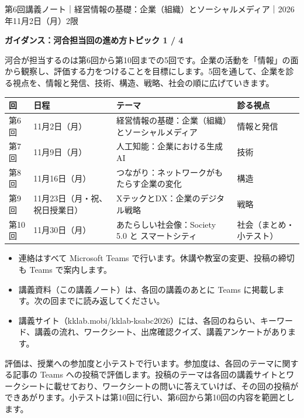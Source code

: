 \documentclass[paper=a4paper,fontsize=10pt,line_length=170mm,number_of_lines=46,baselineskip=1.6zw]{jlreq}
\newcommand\topichead[4]{%
  {\sffamily\footnotesize\color{grayt}#1\par}\vspace{1.5mm}
  {\sffamily\bfseries\LARGE #4}\hfill\colorbox{accent}{\sffamily\footnotesize\bfseries トピック #2 / #3}\par
  \vspace{1.2mm}{\color{ink}\hrule height 0.6pt}\vspace{3mm}}
\newcommand\subhead[1]{\par\vspace{2.6mm}{\sffamily\bfseries\large #1}\par\vspace{1.3mm}}
\begin{document}
\topichead{第6回講義ノート｜経営情報の基礎：企業（組織）とソーシャルメディア｜2026年11月2日（月）2限}{1}{4}{ガイダンス：河合担当回の進め方}
河合が担当するのは第6回から第10回までの5回です。企業の活動を「情報」の面から観察し、評価する力をつけることを目標にします。5回を通して、企業を診る視点を、情報と発信、技術、構造、戦略、社会の順に広げていきます。\par\vspace{1.2mm}
\subhead{5回の構成}
\begin{center}\small\renewcommand{\arraystretch}{1.15}\setlength{\tabcolsep}{1.5mm}
\begin{tabular}{|p{24.0mm}|p{44.3mm}|p{44.3mm}|p{44.3mm}|}\arrayrulecolor{rulec}\hline
\rowcolor{papertwo}\sffamily\bfseries 回 & \sffamily\bfseries 日程 & \sffamily\bfseries テーマ & \sffamily\bfseries 診る視点\\\hline
第6回 & 11月2日（月） & 経営情報の基礎：企業（組織）とソーシャルメディア & 情報と発信\\\hline
第7回 & 11月9日（月） & 人工知能：企業における生成AI & 技術\\\hline
第8回 & 11月16日（月） & つながり：ネットワークがもたらす企業の変化 & 構造\\\hline
第9回 & 11月23日（月・祝、祝日授業日） & XテックとDX：企業のデジタル戦略 & 戦略\\\hline
第10回 & 11月30日（月） & あたらしい社会像：Society 5.0 と スマートシティ & 社会（まとめ・小テスト）\\\hline
\end{tabular}\end{center}\vspace{0.5mm}
\subhead{連絡と資料}
\begin{itemize}[leftmargin=1.5em,itemsep=0.6mm,topsep=0.3mm]
\item 連絡はすべて Microsoft Teams で行います。休講や教室の変更、投稿の締切も Teams で案内します。
\item 講義資料（この講義ノート）は、各回の講義のあとに Teams に掲載します。次の回までに読み返してください。
\item 講義サイト（kklab.mobi/kklab-ksabc2026）には、各回のねらい、キーワード、講義の流れ、ワークシート、出席確認クイズ、講義アンケートがあります。
\end{itemize}\vspace{0.8mm}
\subhead{評価}
評価は、授業への参加度と小テストで行います。参加度は、各回のテーマに関する記事の Teams への投稿で評価します。投稿のテーマは各回の講義サイトとワークシートに載せており、ワークシートの問いに答えていけば、その回の投稿ができあがります。小テストは第10回に行い、第6回から第10回の内容を範囲とします。\par\vspace{1.2mm}
\end{document}
